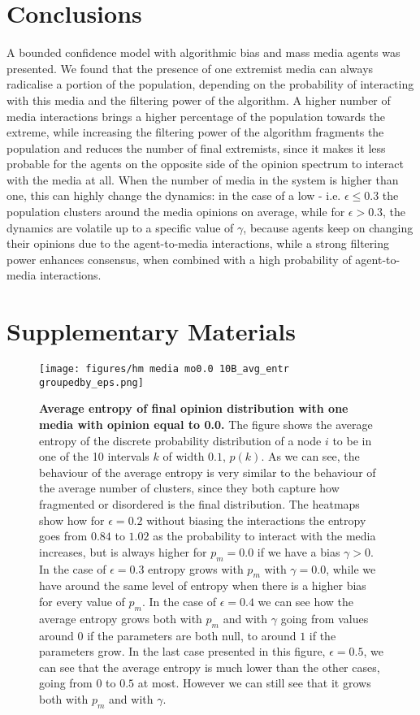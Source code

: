 \documentclass[10pt,letterpaper]{article}
\begin{document}
\section{Conclusions}
\label{sec:conlcusion}
A bounded confidence model with algorithmic bias and mass media agents was presented. We found that the presence of one extremist media can always radicalise a portion of the population, depending on the probability of interacting with this media and the filtering power of the algorithm. A higher number of media interactions brings a higher percentage of the population towards the extreme, while increasing the filtering power of the algorithm fragments the population and reduces the number of final extremists, since it makes it less probable for the agents on the opposite side of the opinion spectrum to interact with the media at all. When the number of media in the system is higher than one, this can highly change the dynamics: in the case of a low  - i.e. $\epsilon \leq 0.3$ the population clusters around the media opinions on average, while for $\epsilon > 0.3$, the dynamics are volatile up to a specific value of $\gamma$, because agents keep on changing their opinions due to the agent-to-media interactions, while a strong filtering power enhances consensus, when combined with a high probability of agent-to-media interactions. 



\section{Supplementary Materials}
\begin{figure}
    \centering
    \texttt{[image: figures/hm media mo0.0 10B\_avg\_entr groupedby\_eps.png]} 
    \caption{\textbf{Average entropy of final opinion distribution with one media with opinion equal to 0.0.} The figure shows the average entropy of the discrete probability distribution of a node $i$ to be in one of the 10 intervals $k$ of width $0.1$, $p(k)$. As we can see, the behaviour of the average entropy is very similar to the behaviour of the average number of clusters, since they both capture how fragmented or disordered is the final distribution. The heatmaps show how for $\epsilon=0.2$ without biasing the interactions the entropy goes from $0.84$ to $1.02$ as the probability to interact with the media increases, but is always higher for $p_m=0.0$ if we have a bias $\gamma > 0$. In the case of $\epsilon =0.3$ entropy grows with $p_m$ with $\gamma=0.0$, while we have around the same level of entropy when there is a higher bias for every value of $p_m$. In the case of $\epsilon=0.4$ we can see how the average entropy grows both with $p_m$ and with $\gamma$ going from values around $0$ if the parameters are both null, to around $1$ if the parameters grow. In the last case presented in this figure, $\epsilon=0.5$, we can see that the average entropy is much lower than the other cases, going from $0$ to $0.5$ at most. However we can still see that it grows both with $p_m$ and with $\gamma$.}
    \label{fig:00avg10Bentrbyeps}
\end{figure}
\end{document}
